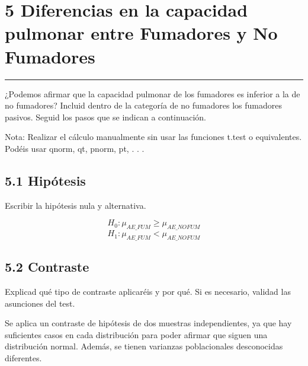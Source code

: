 \documentclass[
]{article}
\begin{document}
\newpage

\hypertarget{diferencias-en-la-capacidad-pulmonar-entre-fumadores-y-no-fumadores}{%
\section{5 Diferencias en la capacidad pulmonar entre Fumadores y No
Fumadores}\label{diferencias-en-la-capacidad-pulmonar-entre-fumadores-y-no-fumadores}}

\begin{center}\rule{0.5\linewidth}{0.5pt}\end{center}

\vspace{0.3cm}

¿Podemos afirmar que la capacidad pulmonar de los fumadores es inferior
a la de no fumadores? Incluid dentro de la categoría de no fumadores los
fumadores pasivos. Seguid los pasos que se indican a continuación.

Nota: Realizar el cálculo manualmente sin usar las funciones t.test o
equivalentes. Podéis usar qnorm, qt, pnorm, pt, . . .

\vspace{0.3cm}

\hypertarget{hipuxf3tesis-1}{%
\subsection{5.1 Hipótesis}\label{hipuxf3tesis-1}}

Escribir la hipótesis nula y alternativa.

\vspace{0.3cm}

\[H_0:  \mu_{AE\_FUM} \geq \mu_{AE\_NOFUM}\]
\[H_1: \mu_{AE\_FUM} < \mu_{AE\_NOFUM}\]

\vspace{0.3cm}

\hypertarget{contraste-1}{%
\subsection{5.2 Contraste}\label{contraste-1}}

Explicad qué tipo de contraste aplicaréis y por qué. Si es necesario,
validad las asunciones del test.

\vspace{0.3cm}

Se aplica un contraste de hipótesis de dos muestras independientes, ya
que hay suficientes casos en cada distribución para poder afirmar que
siguen una distribución normal. Además, se tienen varianzas
poblacionales desconocidas diferentes.
\end{document}
